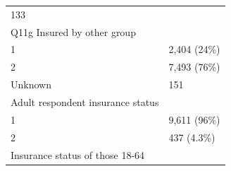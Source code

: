 \documentclass[]{article}
\begin{document}
\begin{longtable}[]{@{}ll@{}}
\begin{minipage}[t]{0.23\columnwidth}
133\strut
\end{minipage}\tabularnewline
\begin{minipage}[t]{0.71\columnwidth}\raggedright
Q11g Insured by other group\strut
\end{minipage} & \begin{minipage}[t]{0.23\columnwidth}\raggedright
\strut
\end{minipage}\tabularnewline
\begin{minipage}[t]{0.71\columnwidth}\raggedright
1\strut
\end{minipage} & \begin{minipage}[t]{0.23\columnwidth}\raggedright
2,404 (24\%)\strut
\end{minipage}\tabularnewline
\begin{minipage}[t]{0.71\columnwidth}\raggedright
2\strut
\end{minipage} & \begin{minipage}[t]{0.23\columnwidth}\raggedright
7,493 (76\%)\strut
\end{minipage}\tabularnewline
\begin{minipage}[t]{0.71\columnwidth}\raggedright
Unknown\strut
\end{minipage} & \begin{minipage}[t]{0.23\columnwidth}\raggedright
151\strut
\end{minipage}\tabularnewline
\begin{minipage}[t]{0.71\columnwidth}\raggedright
Adult respondent insurance status\strut
\end{minipage} & \begin{minipage}[t]{0.23\columnwidth}\raggedright
\strut
\end{minipage}\tabularnewline
\begin{minipage}[t]{0.71\columnwidth}\raggedright
1\strut
\end{minipage} & \begin{minipage}[t]{0.23\columnwidth}\raggedright
9,611 (96\%)\strut
\end{minipage}\tabularnewline
\begin{minipage}[t]{0.71\columnwidth}\raggedright
2\strut
\end{minipage} & \begin{minipage}[t]{0.23\columnwidth}\raggedright
437 (4.3\%)\strut
\end{minipage}\tabularnewline
\begin{minipage}[t]{0.71\columnwidth}\raggedright
Insurance status of those 18-64\strut
\end{minipage} & \begin{minipage}[t]{0.23\columnwidth}\raggedright

\end{minipage}
\end{longtable}
\end{document}
